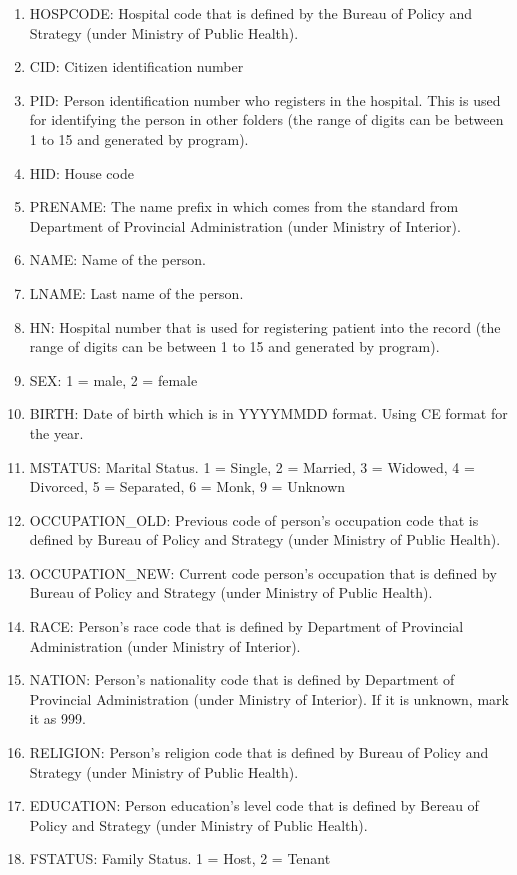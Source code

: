\begin{enumerate}
  \item HOSPCODE: Hospital code that is defined by the Bureau of Policy and Strategy (under Ministry of Public Health).
  \item CID: Citizen identification number 
  \item PID: Person identification number who registers in the hospital. This is used for identifying the person in other folders (the range of digits can be between 1 to 15 and generated by program).
  \item HID: House code
  \item PRENAME: The name prefix in which comes from the standard from Department of Provincial Administration (under Ministry of Interior).
  \item NAME: Name of the person.
  \item LNAME: Last name of the person.
  \item HN: Hospital number that is used for registering patient into the record (the range of digits can be between 1 to 15 and generated by program).
  \item SEX: 1 = male, 2 = female
  \item BIRTH: Date of birth which is in YYYYMMDD format. Using CE format for the year.
  \item MSTATUS: Marital Status. 1 = Single, 2 = Married, 3 = Widowed, 4 = Divorced, 5 = Separated, 6 = Monk, 9 = Unknown
  \item OCCUPATION\_OLD: Previous code of person's occupation code that is defined by Bureau of Policy and Strategy (under Ministry of Public Health).
  \item OCCUPATION\_NEW: Current code person's occupation that is defined by Bureau of Policy and Strategy (under Ministry of Public Health).
  \item RACE: Person's race code that is defined by Department of Provincial Administration (under Ministry of Interior).
  \item NATION: Person's nationality code that is defined by Department of Provincial Administration (under Ministry of Interior). If it is unknown, mark it as 999.
  \item RELIGION: Person's religion code that is defined by Bureau of Policy and Strategy (under Ministry of Public Health).
  \item EDUCATION: Person education's level code that is defined by Bereau of Policy and Strategy (under Ministry of Public Health).
  \item FSTATUS: Family Status. 1 = Host, 2 = Tenant

\end{enumerate}
